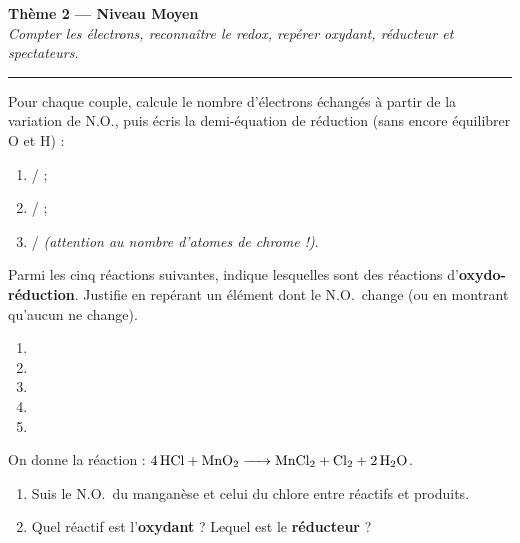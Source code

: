 \documentclass[11pt,a4paper]{article}
\newcommand{\NO}{\ensuremath{\mathrm{N.O.}}}
\newcounter{exo}
\begin{document}
\begin{center}
{\LARGE\bfseries\color{primarydark}Thème 2 — Niveau Moyen}\\[2pt]
{\small\itshape Compter les électrons, reconnaître le redox, repérer oxydant, réducteur et spectateurs.}\\[-4pt]
{\color{primary}\rule{\textwidth}{1pt}}
\end{center}

\begin{exo}
Pour chaque couple, calcule le nombre d'électrons échangés à partir de la variation de \NO, puis
écris la demi-équation de réduction (sans encore équilibrer O et H) :
\begin{enumerate}[label=(\alph*),leftmargin=2em,topsep=1pt,itemsep=1pt]
  \item {}/ ;
  \item {}/ ;
  \item {}/ \quad\emph{(attention au nombre d'atomes de chrome !)}.
\end{enumerate}
\end{exo}

\begin{exo}
Parmi les cinq réactions suivantes, indique lesquelles sont des réactions d'\textbf{oxydo-réduction}.
Justifie en repérant un élément dont le \NO\ change (ou en montrant qu'aucun ne change).
\begin{enumerate}[label=\arabic*),leftmargin=2.2em,topsep=1pt,itemsep=1pt]
  \item {}
  \item {}
  \item {}
  \item {}
  \item {}
\end{enumerate}
\end{exo}

\begin{exo}
On donne la réaction : $\ce{4 HCl + MnO2 -> MnCl2 + Cl2 + 2 H2O}$.
\begin{enumerate}[label=(\alph*),leftmargin=2em,topsep=1pt,itemsep=1pt]
  \item Suis le \NO\ du manganèse et celui du chlore entre réactifs et produits.
  \item Quel réactif est l'\textbf{oxydant} ? Lequel est le \textbf{réducteur} ?
\end{enumerate}
\end{exo}
\end{document}
